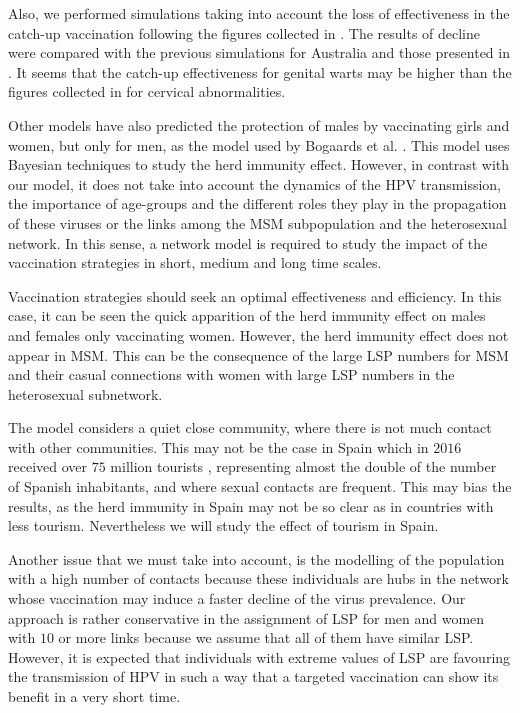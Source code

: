 Also, we performed simulations taking into account the loss of effectiveness in the catch-up vaccination following the figures collected in \cite{Skufca}. The results of decline were compared with the previous simulations for Australia and those presented in \cite{ali2013genital}. It seems that the catch-up effectiveness for genital warts may be higher than the figures collected in \cite{Skufca} for cervical abnormalities.  

Other models have also predicted the protection of males by vaccinating girls and women, but only for men, as the model used by Bogaards et al. \cite{bogaards2015direct}. This model uses Bayesian techniques to study the herd immunity effect. However, in contrast with our model, it does not take into account the dynamics of the HPV transmission, the importance of age-groups and the different roles they play in the propagation of these viruses or the links among the MSM subpopulation and the heterosexual network. In this sense, a network model is required to study the impact of the vaccination strategies in short, medium and long time scales.

Vaccination strategies should seek an optimal effectiveness and efficiency. In this case, it can be seen the quick apparition of the herd immunity effect on males and females only vaccinating women. However, the herd immunity effect does not appear in  MSM. This can be the consequence of the large LSP numbers for MSM and their casual connections with women with large LSP numbers in the heterosexual subnetwork.

The model considers a quiet close community, where there is not much contact with other communities. This may not be the case in Spain which in $2016$ received over $75$ million tourists \cite{INEturismo}, representing almost the double of the number of Spanish inhabitants, and where sexual contacts are frequent. This may bias the results, as the herd immunity in Spain may not be so clear as in countries with less tourism. Nevertheless we will study the effect of tourism in Spain.

Another issue that we must take into account, is the modelling of the population with a high number of contacts because these individuals are hubs in the network whose vaccination may induce a faster decline of the virus prevalence. Our approach is rather conservative in the assignment of LSP for men and women with $10$ or more links because we assume that all of them have similar LSP. However, it is expected that individuals with extreme values of LSP are favouring the transmission of HPV in such a way that  a targeted vaccination can show its benefit in a very short time.

